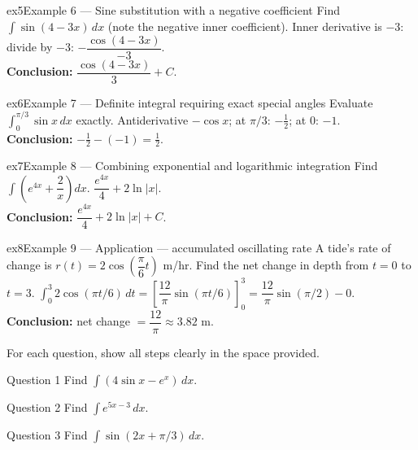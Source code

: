 \documentclass[11pt]{article}
\begin{document}
\begin{example}{ex5}{Example 6 --- Sine substitution with a negative coefficient}
Find $\displaystyle\int\sin(4-3x)\,dx$ (note the negative inner coefficient).\soln
Inner derivative is $-3$: divide by $-3$: $-\dfrac{\cos(4-3x)}{-3}$.\\[3pt]\textbf{Conclusion:} $\dfrac{\cos(4-3x)}{3}+C$.
\end{example}

\begin{example}{ex6}{Example 7 --- Definite integral requiring exact special angles}
Evaluate $\displaystyle\int_0^{\pi/3}\sin x\,dx$ exactly.\soln
Antiderivative $-\cos x$; at $\pi/3$: $-\tfrac12$; at $0$: $-1$.\\[3pt]\textbf{Conclusion:} $-\tfrac12-(-1)=\tfrac12$.
\end{example}

\begin{example}{ex7}{Example 8 --- Combining exponential and logarithmic integration}
Find $\displaystyle\int\left(e^{4x}+\dfrac{2}{x}\right)dx$.\soln
$\dfrac{e^{4x}}4+2\ln|x|$.\\[3pt]\textbf{Conclusion:} $\dfrac{e^{4x}}4+2\ln|x|+C$.
\end{example}

\begin{example}{ex8}{Example 9 --- Application --- accumulated oscillating rate}
A tide's rate of change is $r(t)=2\cos\!\left(\dfrac{\pi}6t\right)$ m/hr. Find the net change in depth from $t=0$ to $t=3$.\soln
$\int_0^3 2\cos(\pi t/6)\,dt=\left[\dfrac{12}{\pi}\sin(\pi t/6)\right]_0^3=\dfrac{12}{\pi}\sin(\pi/2)-0$.\\[3pt]\textbf{Conclusion:} net change $=\dfrac{12}{\pi}\approx3.82$ m.
\end{example}

\clearpage
{}
For each question, show all steps clearly in the space provided.

\begin{qbox}{Question 1}
Find $\displaystyle\int(4\sin x-e^x)\,dx$.\workspace{2.4cm}
\end{qbox}

\begin{qbox}{Question 2}
Find $\displaystyle\int e^{5x-3}\,dx$.\workspace{2.4cm}
\end{qbox}

\begin{qbox}{Question 3}
Find $\displaystyle\int\sin(2x+\pi/3)\,dx$.\workspace{2.4cm}
\end{qbox}
\end{document}
